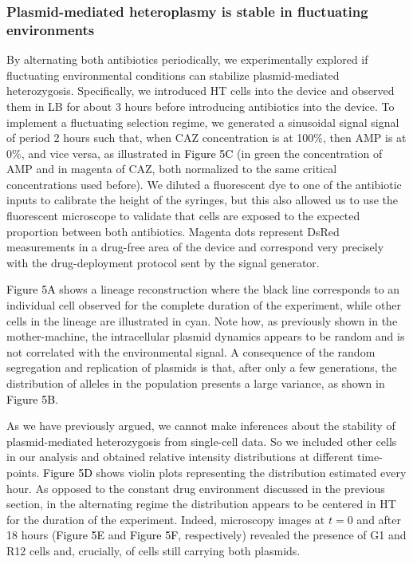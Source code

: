 \documentclass[fleqn,12pt]{wlscirep}
\newcommand{\fig}[1]{\textcolor{black}{#1}}
\begin{document}
\subsubsection{Plasmid-mediated heteroplasmy is stable in fluctuating environments}

By alternating both antibiotics periodically, we experimentally explored if fluctuating environmental conditions can stabilize plasmid-mediated heterozygosis.
Specifically, we introduced HT cells into the device and observed them in LB for about 3 hours before introducing antibiotics into the device.
To implement a fluctuating selection regime, we generated a sinusoidal signal signal of period 2 hours such that, when CAZ concentration is at 100\%, then AMP is at 0\%, and vice versa, as illustrated in \fig{Figure 5C} (in green the concentration of AMP and in magenta of CAZ, both normalized to the same critical concentrations used before). 
We diluted a fluorescent dye to one of the antibiotic inputs to calibrate the height of the syringes, but this also allowed us to use the fluorescent microscope to validate that cells are exposed to the expected proportion between both antibiotics. Magenta dots represent DsRed measurements in a drug-free area of the device and correspond very precisely with the drug-deployment protocol sent by the signal generator.

\fig{Figure 5A} shows a lineage reconstruction where the black line corresponds to an individual cell observed for the complete duration of the experiment, while other cells in the lineage are illustrated in cyan.  Note how, as previously shown in the mother-machine, the intracellular plasmid dynamics appears to be random and is not correlated with the environmental signal.  A consequence of the random segregation and replication of plasmids is that, after only a few generations, the distribution of alleles in the population presents a large variance, as shown in \fig{Figure 5B}.

As we have previously argued, we cannot make inferences about the stability of plasmid-mediated heterozygosis from single-cell data. So we included other cells in our analysis and obtained relative intensity distributions at different time-points.  \fig{Figure 5D} shows violin plots representing the distribution estimated every hour.  As opposed to the constant drug environment discussed in the previous section, in the alternating regime the distribution appears to be centered in HT for the duration of the experiment.  Indeed, microscopy images at $t=0$ and after 18 hours (\fig{Figure 5E} and \fig{Figure 5F}, respectively) revealed the presence of G1 and R12 cells and, crucially, of cells still carrying both plasmids. 
\end{document}
